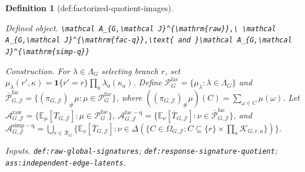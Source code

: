\documentclass{article}
\newtheorem{definition}{Definition}
\begin{document}
\begin{definition}[def:factorized-quotient-images]\label{def:factorized-quotient-images}
\par\smallskip\noindent\emph{Defined object.} \texttt{\textbackslash{}\allowbreak{}mathcal A\_\allowbreak{}\{G,\allowbreak{}\textbackslash{}\allowbreak{}mathcal J\}\allowbreak{}\textasciicircum{}\{\textbackslash{}\allowbreak{}mathrm\{raw\}\allowbreak{}\}\allowbreak{},\allowbreak{}\textbackslash{}\allowbreak{} \textbackslash{}\allowbreak{}mathcal A\_\allowbreak{}\{G,\allowbreak{}\textbackslash{}\allowbreak{}mathcal J\}\allowbreak{}\textasciicircum{}\{\textbackslash{}\allowbreak{}mathrm\{fac-\allowbreak{}q\}\allowbreak{}\}\allowbreak{},\allowbreak{}\textbackslash{}\allowbreak{}text\{ and \}\allowbreak{}\textbackslash{}\allowbreak{}mathcal A\_\allowbreak{}\{G,\allowbreak{}\textbackslash{}\allowbreak{}mathcal J\}\allowbreak{}\textasciicircum{}\{\textbackslash{}\allowbreak{}mathrm\{simp-\allowbreak{}q\}\allowbreak{}\}\allowbreak{}}
\par\smallskip\noindent\emph{Construction.} For \(\lambda\in\Lambda_G\) selecting branch \(r\), set \(\mu_{\lambda}(r',\kappa)=\mathbf 1\{r'=r\}\prod_a\lambda_a(\kappa_a)\). Define \(\mathcal P_G^{\mathrm{fac}}=\{\mu_{\lambda}:\lambda\in\Lambda_G\}\) and \(\overline{\mathcal P}_{G,\mathcal J}^{\mathrm{fac}}=\{(\pi_{G,\mathcal J})_{\#}\mu:\mu\in\mathcal P_G^{\mathrm{fac}}\}\), where \(((\pi_{G,\mathcal J})_{\#}\mu)(C)=\sum_{\omega\in C}\mu(\omega)\). Let \(\mathcal A_{G,\mathcal J}^{\mathrm{raw}}=\{\mathbb E_{\mu}[T_{G,\mathcal J}]:\mu\in\mathcal P_G^{\mathrm{fac}}\}\), \(\mathcal A_{G,\mathcal J}^{\mathrm{fac-q}}=\{\mathbb E_{\nu}[\overline T_{G,\mathcal J}]:\nu\in\overline{\mathcal P}_{G,\mathcal J}^{\mathrm{fac}}\}\), and \(\mathcal A_{G,\mathcal J}^{\mathrm{simp-q}}=\bigcup_{r\in\mathcal R_G}\{\mathbb E_{\nu}[\overline T_{G,\mathcal J}]:\nu\in\Delta(\{C\in\overline\Omega_{G,\mathcal J}:C\subseteq\{r\}\times\prod_a\mathcal K_{G,r,a}\})\}\).
\par\smallskip\noindent\emph{Inputs.} \texttt{def:\allowbreak{}raw-\allowbreak{}global-\allowbreak{}signatures}; \texttt{def:\allowbreak{}response-\allowbreak{}signature-\allowbreak{}quotient}; \texttt{ass:\allowbreak{}independent-\allowbreak{}edge-\allowbreak{}latents}.
\end{definition}
\end{document}

